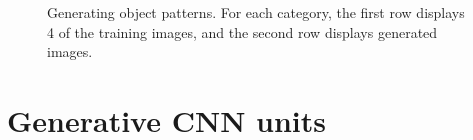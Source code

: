 \documentclass[letterpaper]{article}
\begin{document}
\begin{figure}
%	
%	
%	
	\caption{Generating object patterns. For each category, the first row displays 4 of the training images, and the second row displays generated images.}
	\label{fig:object}
\end{figure}
   
\section{Generative CNN units} 
\end{document}
